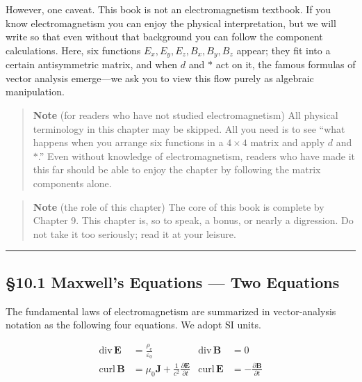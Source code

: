 However, one caveat. This book is not an electromagnetism textbook. If
you know electromagnetism you can enjoy the physical interpretation, but
we will write so that even without that background you can follow the
component calculations. Here, six functions
\(E_x, E_y, E_z, B_x, B_y, B_z\) appear; they fit into a certain
antisymmetric matrix, and when \(d\) and \(\ast\) act on it, the famous
formulas of vector analysis emerge---we ask you to view this flow purely
as algebraic manipulation.

\begin{quote}
\textbf{Note} (for readers who have not studied electromagnetism) All
physical terminology in this chapter may be skipped. All you need is to
see ``what happens when you arrange six functions in a \(4\times4\)
matrix and apply \(d\) and \(\ast\).'' Even without knowledge of
electromagnetism, readers who have made it this far should be able to
enjoy the chapter by following the matrix components alone.
\end{quote}

\begin{quote}
\textbf{Note} (the role of this chapter) The core of this book is
complete by Chapter 9. This chapter is, so to speak, a bonus, or nearly
a digression. Do not take it too seriously; read it at your leisure.
\end{quote}

\begin{center}\rule{0.5\linewidth}{0.5pt}\end{center}

\hypertarget{maxwells-equations-two-equations}{%
\subsection{§10.1 Maxwell's Equations --- Two
Equations}\label{maxwells-equations-two-equations}}

The fundamental laws of electromagnetism are summarized in
vector-analysis notation as the following four equations. We adopt SI
units.

\[\begin{aligned}
\mathrm{div}\,\mathbf{E} &= \frac{\rho_{\mathrm e}}{\varepsilon_0} &
\mathrm{div}\,\mathbf{B} &= 0 \\[0.5em]
\mathrm{curl}\,\mathbf{B} &= \mu_0\mathbf{J} + \frac{1}{c^2}\frac{\partial \mathbf{E}}{\partial t} &
\mathrm{curl}\,\mathbf{E} &= -\frac{\partial \mathbf{B}}{\partial t}
\end{aligned}\]

